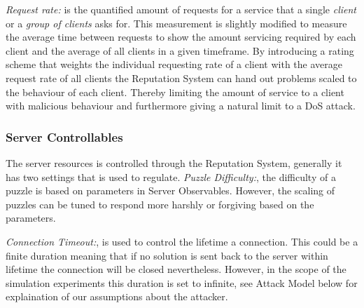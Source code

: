 \emph{Request rate:} is the quantified amount of requests for a service that a single \emph{client} or a \emph{group of clients} asks for. This measurement is slightly modified to measure the average time between requests to show the amount servicing required by each client and the average of all clients in a given timeframe. By introducing a rating scheme that weights the individual requesting rate of a client with the average request rate of all clients the Reputation System can hand out problems scaled to the behaviour of each client. Thereby limiting the amount of service to a client with malicious behaviour and furthermore giving a natural limit to a DoS attack.


\subsubsection{Server Controllables}
The server resources is controlled through the Reputation System, generally it has two settings that is used to regulate.
\emph{Puzzle Difficulty:}, the difficulty of a puzzle is based on parameters in Server Observables. However, the scaling of puzzles can be tuned to respond more harshly or forgiving based on the parameters.

\emph{Connection Timeout:}, is used to control the lifetime a connection. This could be a finite duration meaning that if no solution is sent back to the server within lifetime the connection will be closed nevertheless.
However, in the scope of the simulation experiments this duration is set to infinite, see Attack Model below for explaination of our assumptions about the attacker. 
